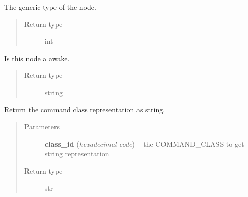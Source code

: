 \documentclass[letterpaper,10pt,english]{sphinxmanual}
\begin{document}
\begin{fulllineitems}
\begin{fulllineitems}
\end{fulllineitems}


\begin{fulllineitems}
\label{node:openzwave.node.ZWaveNode.generic}
The generic type of the node.
\begin{quote}\begin{description}
\item[{Return type}] \leavevmode
int

\end{description}\end{quote}

\end{fulllineitems}


\begin{fulllineitems}
\label{node:openzwave.node.ZWaveNode.getNodeQueryStage}
Is this node a awake.
\begin{quote}\begin{description}
\item[{Return type}] \leavevmode
string

\end{description}\end{quote}

\end{fulllineitems}


\begin{fulllineitems}
\label{node:openzwave.node.ZWaveNode.get_command_class_as_string}
Return the command class representation as string.
\begin{quote}\begin{description}
\item[{Parameters}] \leavevmode
\textbf{class\_id} (\emph{hexadecimal code}) -- the COMMAND\_CLASS to get string representation

\item[{Return type}] \leavevmode
str

\end{description}\end{quote}


\end{fulllineitems}
\end{fulllineitems}
\end{document}
